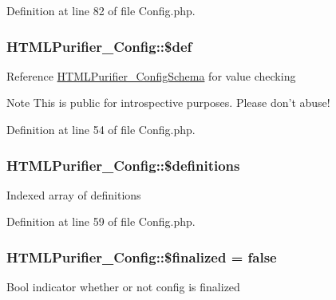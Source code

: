Definition at line 82 of file Config.\+php.

\hypertarget{classHTMLPurifier__Config_aa76555df1991f670de3b1b3019929673}{
\subsubsection[{\$def}]{\setlength{\rightskip}{0pt plus 5cm}H\+T\+M\+L\+Purifier\+\_\+\+Config\+::\$def}}\label{classHTMLPurifier__Config_aa76555df1991f670de3b1b3019929673}
Reference \hyperlink{classHTMLPurifier__ConfigSchema}{H\+T\+M\+L\+Purifier\+\_\+\+Config\+Schema} for value checking \begin{DoxyNote}{Note}
This is public for introspective purposes. Please don't abuse! 
\end{DoxyNote}


Definition at line 54 of file Config.\+php.

\hypertarget{classHTMLPurifier__Config_a744bb585ea736e15c14e308ce34a89cf}{
\subsubsection[{\$definitions}]{\setlength{\rightskip}{0pt plus 5cm}H\+T\+M\+L\+Purifier\+\_\+\+Config\+::\$definitions\hspace{0.3cm}{\ttfamily [protected]}}}\label{classHTMLPurifier__Config_a744bb585ea736e15c14e308ce34a89cf}
Indexed array of definitions 

Definition at line 59 of file Config.\+php.

\hypertarget{classHTMLPurifier__Config_a6f4aab5c90546e30139d6c57657c7008}{
\subsubsection[{\$finalized}]{\setlength{\rightskip}{0pt plus 5cm}H\+T\+M\+L\+Purifier\+\_\+\+Config\+::\$finalized = false\hspace{0.3cm}{\ttfamily [protected]}}}\label{classHTMLPurifier__Config_a6f4aab5c90546e30139d6c57657c7008}
Bool indicator whether or not config is finalized 

